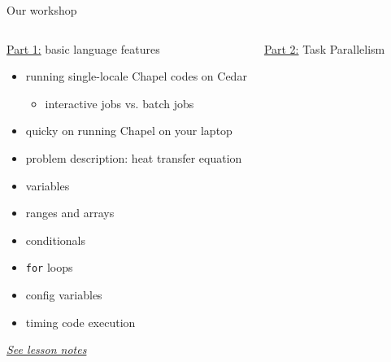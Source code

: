 \documentclass[10pt,xcolor=pdftex,dvipsnames,table]{beamer}
\newcommand{\tc}{\textcolor}
\begin{document}
\begin{frame}{Our workshop}
  \begin{columns}[]
    \begin{block}{}
      \begin{center}
        {\sc \underline{Part 1:} basic language features}
      \end{center}
      \vspace{-2mm}
      {\let\normalsize\footnotesize \normalsize
        \begin{itemize}\setlength{\itemsep}{0.6mm}
        \item running single-locale Chapel codes on Cedar
          {\let\small\scriptsize \small
            \begin{itemize}\setlength{\itemsep}{0.5mm}
            \item interactive jobs vs. batch jobs
          \end{itemize}}
        \item quicky on running Chapel on your laptop
        \item problem description: heat transfer equation
        \item variables
        \item ranges and arrays
        \item conditionals
        \item \tc{Mahogany}{\texttt{for}} loops
        \item config variables
        \item timing code execution
        \end{itemize}}
      \begin{center}
        \href{http://bit.ly/2CDRuxQ}{\tc{Mahogany}{\it See lesson notes}}
      \end{center}
    \end{block}
    \begin{block}{}
      \begin{center}
        {\sc \underline{Part 2:} Task Parallelism}
      \end{center}
      \vspace{-2mm}
      {\let\normalsize\footnotesize \normalsize
        \begin{itemize}\setlength{\itemsep}{1mm}

\end{itemize}}
\end{block}
\end{columns}
\end{frame}
\end{document}
